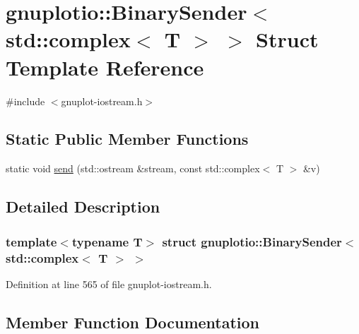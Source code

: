 \hypertarget{structgnuplotio_1_1_binary_sender_3_01std_1_1complex_3_01_t_01_4_01_4}{}\section{gnuplotio\+:\+:Binary\+Sender$<$ std\+:\+:complex$<$ T $>$ $>$ Struct Template Reference}
\label{structgnuplotio_1_1_binary_sender_3_01std_1_1complex_3_01_t_01_4_01_4}


{\ttfamily \#include $<$gnuplot-\/iostream.\+h$>$}

\subsection*{Static Public Member Functions}
\begin{DoxyCompactItemize}
\item 
static void \hyperlink{structgnuplotio_1_1_binary_sender_3_01std_1_1complex_3_01_t_01_4_01_4_a759de700a1cd68000830a4b15a6fec49}{send} (std\+::ostream \&stream, const std\+::complex$<$ T $>$ \&v)
\end{DoxyCompactItemize}


\subsection{Detailed Description}
\subsubsection*{template$<$typename T$>$\newline
struct gnuplotio\+::\+Binary\+Sender$<$ std\+::complex$<$ T $>$ $>$}



Definition at line 565 of file gnuplot-\/iostream.\+h.



\subsection{Member Function Documentation}
\mbox{\label{structgnuplotio_1_1_binary_sender_3_01std_1_1complex_3_01_t_01_4_01_4_a759de700a1cd68000830a4b15a6fec49}} 
